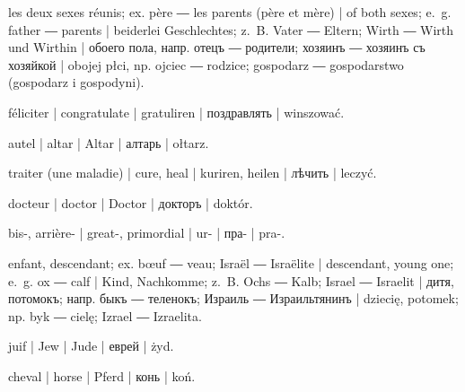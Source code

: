 \begin{ekzvocab}{1em}
 les deux sexes réunis; ex.  père ―  les parents (père et mère) | of both sexes; e.~g.  father ―  parents | beiderlei Geschlechtes; z.~B.  Vater ―  Eltern;  Wirth ―  Wirth und Wirthin | обоего пола, напр.  отецъ ―  родители;  хозяинъ ―  хозяинъ съ хозяйкой | obojej płci, np.  ojciec ―  rodzice;  gospodarz ―  gospodarstwo (gospodarz i gospodyni).

 féliciter | congratulate | gratuliren | поздравлять | winszować.

 autel | altar | Altar | алтарь | ołtarz.

 traiter (une maladie) | cure, heal | kuriren, heilen | лѣчить | leczyć.

 docteur | doctor | Doctor | докторъ | doktór.

 bis-, arrière- | great-, primordial | ur- | пра- | pra-.

 enfant, descendant; ex.  bœuf ―  veau;  Israël ―  Israëlite | descendant, young one; e.~g.  ox ―  calf | Kind, Nachkomme; z.~B.  Ochs ―  Kalb;  Israel ―  Israelit | дитя, потомокъ; напр.  быкъ ―  теленокъ;  Израиль ―  Израильтянинъ | dziecię, potomek; np.  byk ―  cielę;  Izrael ―  Izraelita.

 juif | Jew | Jude | еврей | żyd.

 cheval | horse | Pferd | конь | koń.

\end{ekzvocab}



